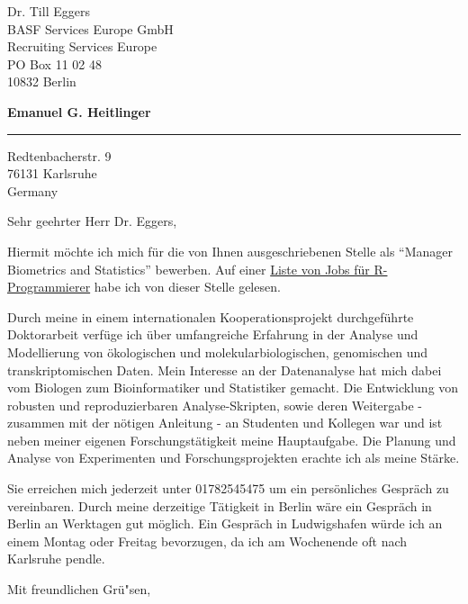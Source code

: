 \documentclass{letter} %
\begin{document}
\signature{Emanuel G. Heitlinger}           %
\longindentation=0pt                       %
\let\raggedleft\raggedright                %
 
 
\begin{letter}{Dr. Till Eggers \\
BASF Services Europe GmbH   \\
Recruiting Services Europe  \\
PO Box 11 02 48  \\
10832 Berlin
}

\begin{center}
{\large\bf Emanuel G. Heitlinger} 
\end{center}
\medskip\hrule height 1pt
\begin{center}
{Redtenbacherstr. 9  \\   76131 Karlsruhe \\ Germany} 
\end{center} \vfill %
 
 
\opening{Sehr geehrter Herr Dr. Eggers,}
 
\noindent Hiermit m\"ochte ich mich f\"ur die von Ihnen
ausgeschriebenen Stelle als ``Manager Biometrics and Statistics''
bewerben. Auf einer
\href{http://www.programmingr.com/category/stype/r-job-listings}{Liste
  von Jobs f\"ur R-Programmierer} habe ich von dieser Stelle
gelesen. 

Durch meine in einem internationalen Kooperationsprojekt
durchgef\"uhrte Doktorarbeit verf\"uge ich \"uber umfangreiche
Erfahrung in der Analyse und Modellierung von \"okologischen und
molekularbiologischen, genomischen und transkriptomischen Daten. Mein
Interesse an der Datenanalyse hat mich dabei vom Biologen zum
Bioinformatiker und Statistiker gemacht. Die Entwicklung von robusten
und reproduzierbaren Analyse-Skripten, sowie deren Weitergabe -
zusammen mit der n\"otigen Anleitung - an Studenten und Kollegen war
und ist neben meiner eigenen Forschungst\"atigkeit meine
Hauptaufgabe. Die Planung und Analyse von Experimenten und
Forschungsprojekten erachte ich als meine St\"arke.

\noindent Sie erreichen mich jederzeit unter 01782545475 um ein
pers\"onliches Gespr\"ach zu vereinbaren. Durch meine derzeitige
T\"atigkeit in Berlin w\"are ein Gespr\"ach in Berlin an Werktagen gut
m\"oglich. Ein Gespr\"ach in Ludwigshafen w\"urde ich an einem Montag
oder Freitag bevorzugen, da ich am Wochenende oft nach Karlsruhe
pendle.
 
\closing{Mit freundlichen Gr\"u"sen,} 
 
\end{letter}
 
\end{document}

